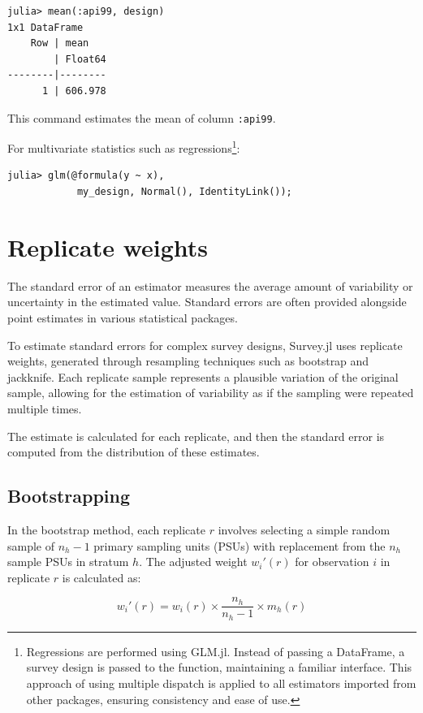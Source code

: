 \documentclass{article}
\begin{document}
\begin{verbatim}
julia> mean(:api99, design)
1x1 DataFrame
    Row | mean    
        | Float64 
--------|--------
      1 | 606.978
    \end{verbatim}
This command estimates the mean of column \verb|:api99|.

For multivariate statistics such as regressions\footnote{Regressions are performed using GLM.jl. Instead of passing a DataFrame, a survey design is passed to the function, maintaining a familiar interface. This approach of using multiple dispatch is applied to all estimators imported from other packages, ensuring consistency and ease of use.}:

\begin{verbatim}
julia> glm(@formula(y ~ x),
            my_design, Normal(), IdentityLink()); 
\end{verbatim}

\section{Replicate weights}

The standard error of an estimator measures the average amount of variability or uncertainty in the estimated value. Standard errors are often provided alongside point estimates in various statistical packages.

To estimate standard errors for complex survey designs, Survey.jl uses replicate weights, generated through resampling techniques such as bootstrap and jackknife. Each replicate sample represents a plausible variation of the original sample, allowing for the estimation of variability as if the sampling were repeated multiple times.

The estimate is calculated for each replicate, and then the standard error is computed from the distribution of these estimates. 

\subsection{Bootstrapping}



In the bootstrap method, each replicate \( r \) involves selecting a simple random sample of \( n_h - 1 \) primary sampling units (PSUs) with replacement from the \( n_h \) sample PSUs in stratum \( h \). The adjusted weight \( w_i'(r) \) for observation \( i \) in replicate \( r \) is calculated as:

\begin{equation}
    w_i'(r) = w_i(r) \times \frac{n_h}{n_h - 1} \times m_{h}(r)
\end{equation}
\end{document}

